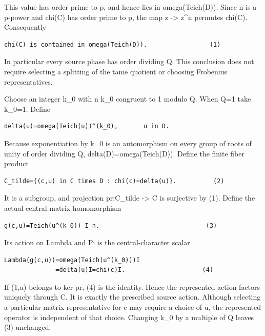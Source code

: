 This value has order prime to p, and hence lies in omega(Teich(D)).
Since n is a p-power and chi(C) has order prime to p, the map z
-\textgreater{} z\^{}n permutes chi(C). Consequently

\begin{Verbatim}[fontsize=\small,breaklines=true,breakanywhere=true]
chi(C) is contained in omega(Teich(D)).                 (1)
\end{Verbatim}

In particular every source phase has order dividing Q. This conclusion
does not require selecting a splitting of the tame quotient or choosing
Frobenius representatives.

Choose an integer k\_0 with n k\_0 congruent to 1 modulo Q. When Q=1 take
k\_0=1. Define

\begin{Verbatim}[fontsize=\small,breaklines=true,breakanywhere=true]
delta(u)=omega(Teich(u))^(k_0),       u in D.
\end{Verbatim}

Because exponentiation by k\_0 is an automorphism on every group of
roots of unity of order dividing Q, delta(D)=omega(Teich(D)). Define the
finite fiber product

\begin{Verbatim}[fontsize=\small,breaklines=true,breakanywhere=true]
C_tilde={(c,u) in C times D : chi(c)=delta(u)}.          (2)
\end{Verbatim}

It is a subgroup, and projection pr:C\_tilde -\textgreater{} C is
surjective by (1). Define the actual central matrix homomorphism

\begin{Verbatim}[fontsize=\small,breaklines=true,breakanywhere=true]
g(c,u)=Teich(u^(k_0)) I_n.                             (3)
\end{Verbatim}

Its action on Lambda and Pi is the central-character scalar

\begin{Verbatim}[fontsize=\small,breaklines=true,breakanywhere=true]
Lambda(g(c,u))=omega(Teich(u^(k_0)))I
              =delta(u)I=chi(c)I.                     (4)
\end{Verbatim}

If (1,u) belongs to ker pr, (4) is the identity. Hence the represented
action factors uniquely through C. It is exactly the prescribed source
action. Although selecting a particular matrix representative for c may
require a choice of u, the represented operator is independent of that
choice. Changing k\_0 by a multiple of Q leaves (3) unchanged.

